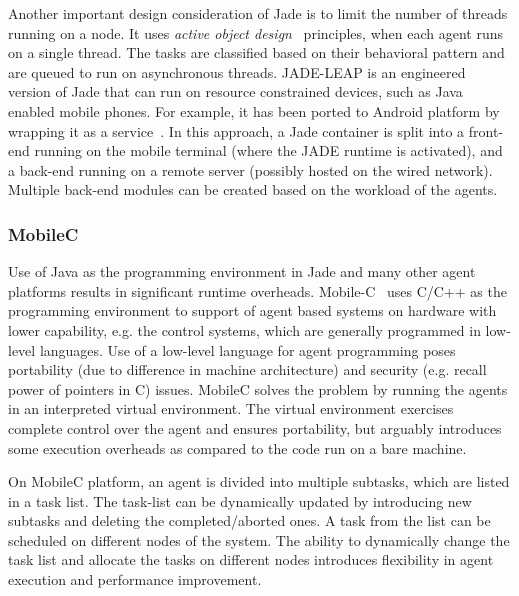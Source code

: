 Another important design consideration of Jade is to limit the number of threads running on a node. It uses {\em active object 
design}~\citep{Lavender:1996} principles, when each agent runs on a single thread. The tasks are classified based on their
behavioral pattern and are queued to run on asynchronous threads.
JADE-LEAP is an engineered version of Jade that can run on resource constrained devices, such as Java enabled mobile phones. For 
example, it has been ported to Android platform by wrapping it as a service~\citep{Bergenti:2014}. In this approach, a Jade container 
is split into a front-end running on the mobile terminal (where the JADE runtime is activated), and a back-end running on a remote
server (possibly hosted on the wired network). Multiple back-end modules can be created based on the workload of the agents.


\subsubsection*{MobileC}

Use of Java as the programming environment in Jade and many other agent platforms results in significant runtime overheads.
Mobile-C~\citep{Chen:2006} uses C/C++ as the programming environment to support of agent based systems on hardware with lower 
capability, e.g. the 
control systems, which are generally programmed in low-level languages. Use of a low-level language for agent programming
poses portability (due to difference in machine architecture) and security (e.g. recall power of pointers in C) issues. MobileC 
solves the problem by running the agents in an interpreted virtual environment. The virtual environment exercises complete
control over the agent and ensures portability, but arguably introduces some execution overheads as compared to the code run 
on a bare machine.

On MobileC platform, an agent is divided into multiple subtasks, which are listed in a task list. The task-list can be dynamically 
updated by introducing new subtasks and deleting the completed/aborted ones. A task from the list can be scheduled on different nodes 
of the system. The ability to dynamically change the task list and allocate the tasks on different nodes introduces flexibility 
in agent execution and performance improvement.

